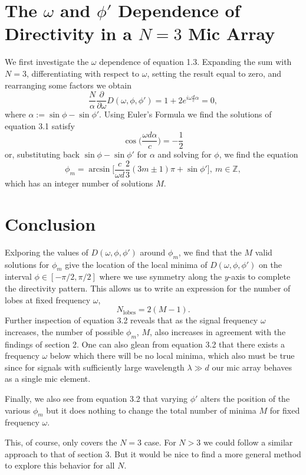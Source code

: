 \documentclass{article}
\begin{document}
\section{The $\omega$ and $\phi'$ Dependence of Directivity in a $N=3$ Mic Array}
We first investigate the $\omega$ dependence of equation 1.3. Expanding the sum with $N=3$, differentiating with
respect to $\omega$, setting the result equal to zero, and rearranging some factors we obtain
\begin{equation}
  \frac{N}{\alpha} \frac{\partial}{\partial \omega} D(\omega, \phi, \phi') = 1 + 2e^{i\omega \frac{d}{c} \alpha} = 0,
\end{equation}
where $\alpha := \sin{\phi}-\sin{\phi'}$. Using Euler's Formula we find the solutions of equation 3.1 satisfy
$$ \cos\Big( \frac{\omega d \alpha}{c} \Big) = - \frac{1}{2} $$ or, substituting back $\sin{\phi}-\sin{\phi'}$ for $\alpha$ and
solving for $\phi$, we find the equation
\begin{equation}
  \phi_m = \arcsin \Big[ \frac{c}{\omega d} \frac{2}{3} (3m \pm 1) \pi + \sin{\phi'} \Big],\ m \in \mathbb{Z},
\end{equation}
which has an integer number of solutions $M$.

\section{Conclusion}
Exlporing the values of $D(\omega,\phi,\phi')$ around $\phi_m$, we find that the $M$ valid solutions for $\phi_m$ give the location of
the local minima of $D(\omega,\phi,\phi')$ on the interval $\phi \in [-\pi/2,\pi/2]$ where we use symmetry along the $y$-axis to complete
the directivity pattern. This allows us to write an expression for the number of lobes at fixed frequency $\omega$,
\begin{equation}
  N_{\text{lobes}} = 2(M-1).
\end{equation}
Further inspection of equation 3.2 reveals that as the signal frequency $\omega$ increases, the
number of possible $\phi_m$, $M$, also increases in agreement with the findings of section 2. One can also glean from equation
3.2 that there exists a frequency $\omega$ below which there will be no local minima, which also must be true since for
signals with sufficiently large wavelength $\lambda \gg d$ our mic array behaves as a single mic element.

Finally, we also see from equation 3.2 that varying $\phi'$ alters the position of the various $\phi_m$ but it does nothing
to change the total number of minima $M$ for fixed frequency $\omega$.

This, of course, only covers the $N=3$ case. For $N>3$ we could follow a similar approach to that of section 3. But it
would be nice to find a more general method to explore this behavior for all $N$.




\end{document}

